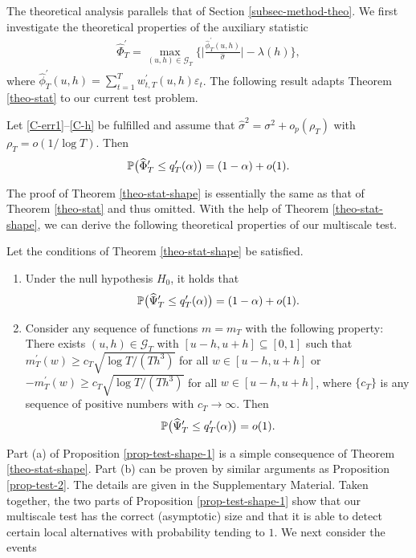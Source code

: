 The theoretical analysis parallels that of Section \ref{subsec-method-theo}. We first investigate the theoretical properties of the auxiliary statistic 
\begin{align*}
\widehat{\Phi}_T^\prime = \max_{(u,h) \in \mathcal{G}_T} \Big\{ \Big| \frac{\widehat{\phi}_T^\prime(u,h)}{\widehat{\sigma}} \Big| - \lambda(h) \Big\}, 
\end{align*}
where $\widehat{\phi}_T^\prime(u,h) = \sum_{t=1}^T w_{t,T}^\prime(u,h) \varepsilon_t$. The following result adapts Theorem \ref{theo-stat} to our current test problem. 
\begin{theorem}\label{theo-stat-shape}
Let \ref{C-err1}--\ref{C-h} be fulfilled and assume that $\widehat{\sigma}^2 = \sigma^2 + o_p(\rho_T)$ with $\rho_T = o(1/\log T)$. Then
\[ \mathbb{P} \big( \widehat{\Phi}_T^\prime \le q_T^\prime(\alpha) \big) = (1 - \alpha) + o(1). \]
\end{theorem}
The proof of Theorem \ref{theo-stat-shape} is essentially the same as that of Theorem \ref{theo-stat} and thus omitted. With the help of Theorem \ref{theo-stat-shape}, we can derive the following theoretical properties of our multiscale test. 
\newpage
\begin{prop}\label{prop-test-shape-1}
Let the conditions of Theorem \ref{theo-stat-shape} be satisfied. 
\begin{enumerate}[label=(\alph*),leftmargin=0.75cm]
\item Under the null hypothesis $H_0$, it holds that 
\[ \mathbb{P} \big( \widehat{\Psi}_T^\prime \le q_T^\prime(\alpha) \big) = (1 - \alpha) + o(1). \]
\item Consider any sequence of functions $m = m_T$ with the following property: There exists $(u,h) \in \mathcal{G}_T$ with $[u-h,u+h] \subseteq [0,1]$ such that $m_T^\prime(w) \ge c_T \sqrt{\log T/(Th^3)}$ for all $w \in [u-h,u+h]$ or $-m_T^\prime(w) \ge c_T \sqrt{\log T/(Th^3)}$ for all $w \in [u-h,u+h]$, where $\{c_T\}$ is any sequence of positive numbers with $c_T \rightarrow \infty$. Then 
\[ \mathbb{P} \big( \widehat{\Psi}_T^\prime \le q_T^\prime(\alpha) \big) = o(1). \]
\end{enumerate}
\end{prop}
Part (a) of Proposition \ref{prop-test-shape-1} is a simple consequence of Theorem \ref{theo-stat-shape}. Part (b) can be proven by similar arguments as Proposition \ref{prop-test-2}. The details are given in the Supplementary Material. Taken together, the two parts of Proposition \ref{prop-test-shape-1} show that our multiscale test has the correct (asymptotic) size and that it is able to detect certain local alternatives with probability tending to $1$. We next consider the events

